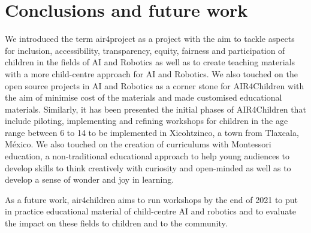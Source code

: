 \documentclass[sigconf]{acmart}
\begin{document}

\section{Conclusions and future work}
We introduced the term air4project as a project with the aim to tackle aspects for inclusion, accessibility, transparency, equity, fairness and participation of children in the fields of AI and Robotics as well as to create teaching materials with a more child-centre approach for AI and Robotics.
We also touched on the open source projects in AI and Robotics as a corner stone for AIR4Children with the aim of minimise cost of the materials and made customised educational materials.  
Similarly, it has been presented the initial phases of AIR4Children that include piloting, implementing and refining workshops for children in the age range between 6 to 14 to be implemented in Xicohtzinco, a town from Tlaxcala, M\'exico.
We also touched on the creation of curriculums with Montessori education, a non-traditional educational approach to help young audiences to develop skills to think creatively with curiosity and open-minded as well as to develop a sense of wonder and joy in learning.

As a future work, air4children aims to run workshops by the end of 2021 to put in practice educational material of child-centre AI and robotics and to evaluate the impact on these fields to children and to the community. 

\end{document}
